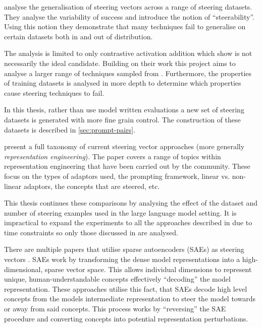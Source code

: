 analyse the generalisation of steering vectors across a range of steering datasets.
They analyse the variability of success and introduce the notion of ``steerability''.
Using this notion they demonstrate that many techniques fail to generalise on certain datasets both in and out of distribution.

The analysis is limited to only contrastive activation addition \citep{caa} which \citet{steering-clear} show is not necessarily the ideal candidate.
Building on their work this project aims to analyse a larger range of techniques sampled from \citet{steering-clear}.
Furthermore, the properties of training datasets is analysed in more depth to determine which properties cause steering techniques to fail.

In this thesis, rather than use model written evaluations \citep{mwe} a new set of steering datasets is generated with more fine grain control.
The construction of these datasets is described in \cref{sec:prompt-pairs}.

present a full taxonomy of current steering vector approaches (more generally \emph{representation engineering}).
The paper covers a range of topics within representation engineering that have been carried out by the community.
These focus on the types of adaptors used, the prompting framework, linear vs. non-linear adaptors, the concepts that are steered, etc.

This thesis continues these comparisons by analysing the effect of the dataset and number of steering examples used in the large language model setting.
It is impractical to expand the experiments to all the approaches described in \citet{steering-taxonomy} due to time constraints so only those discussed in \citet{steering-clear} are analysed.


There are multiple papers that utilise sparse autoencoders (SAEs) as steering vectors \citep{sae-improved, sae-steering, icl-sae}.
SAEs work by transforming the dense model representations into a high-dimensional, sparse vector space.
This allows individual dimensions to represent unique, human-understandable concepts effectively ``decoding'' the model representation.
These approaches utilise this fact, that SAEs decode high level concepts from the models intermediate representation to steer the model towards or away from said concepts.
This process works by ``reversing'' the SAE procedure and converting concepts into potential representation perturbations.

